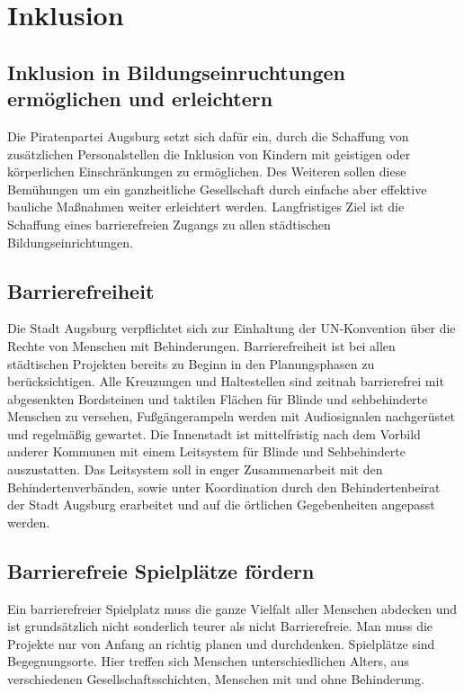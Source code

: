 \chapter{Inklusion}

  \section{Inklusion in Bildungseinruchtungen ermöglichen und 
  erleichtern}
  
  Die Piratenpartei Augsburg setzt sich dafür ein, durch die 
  Schaffung von 
  zusätzlichen Personalstellen die Inklusion von Kindern mit 
  geistigen oder 
  körperlichen Einschränkungen zu ermöglichen. Des Weiteren sollen 
  diese 
  Bemühungen um ein ganzheitliche Gesellschaft durch einfache aber 
  effektive 
  bauliche Maßnahmen weiter erleichtert werden. Langfristiges Ziel 
  ist die 
  Schaffung eines barrierefreien Zugangs zu allen städtischen 
  Bildungseinrichtungen.
  
  \section{Barrierefreiheit}
  
  Die Stadt Augsburg verpflichtet sich zur Einhaltung der 
  UN-Konvention über 
  die Rechte von Menschen mit Behinderungen. Barrierefreiheit ist bei 
  allen 
  städtischen Projekten bereits zu Beginn in den Planungsphasen zu 
  berücksichtigen. Alle Kreuzungen und Haltestellen sind zeitnah 
  barrierefrei 
  mit abgesenkten Bordsteinen und taktilen Flächen für Blinde und 
  sehbehinderte Menschen zu versehen, Fußgängerampeln werden mit 
  Audiosignalen 
  nachgerüstet und regelmäßig gewartet. Die Innenstadt ist 
  mittelfristig nach 
  dem Vorbild anderer Kommunen mit einem Leitsystem für Blinde und 
  Sehbehinderte auszustatten. Das Leitsystem soll in enger 
  Zusammenarbeit mit 
  den Behindertenverbänden, sowie unter Koordination durch den 
  Behindertenbeirat der Stadt Augsburg erarbeitet und auf die 
  örtlichen 
  Gegebenheiten angepasst werden.
  
  \section{Barrierefreie Spielplätze fördern}
  
  Ein barrierefreier Spielplatz muss die ganze Vielfalt aller 
  Menschen 
  abdecken und ist grundsätzlich nicht sonderlich teurer als nicht 
  Barrierefreie. Man muss die Projekte nur von Anfang an richtig 
  planen und 
  durchdenken. Spielplätze sind Begegnungsorte. Hier treffen sich 
  Menschen 
  unterschiedlichen Alters, aus verschiedenen Gesellschaftsschichten, 
  Menschen 
  mit und ohne Behinderung.
  
